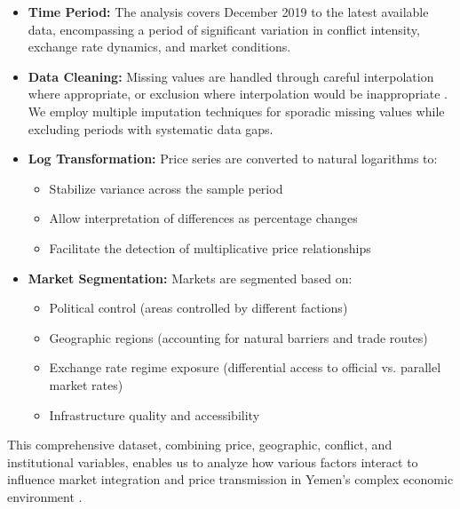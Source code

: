 \begin{itemize}[nosep]
\item \textbf{Time Period:} The analysis covers December 2019 to the latest available data, encompassing a period of significant variation in conflict intensity, exchange rate dynamics, and market conditions.

\item \textbf{Data Cleaning:} Missing values are handled through careful interpolation where appropriate, or exclusion where interpolation would be inappropriate \citep{lutkepohl2005}. We employ multiple imputation techniques for sporadic missing values while excluding periods with systematic data gaps.

\item \textbf{Log Transformation:} Price series are converted to natural logarithms to:
  \begin{itemize}[nosep]
  \item Stabilize variance across the sample period
  \item Allow interpretation of differences as percentage changes
  \item Facilitate the detection of multiplicative price relationships
  \end{itemize}

\item \textbf{Market Segmentation:} Markets are segmented based on:
  \begin{itemize}[nosep]
  \item Political control (areas controlled by different factions)
  \item Geographic regions (accounting for natural barriers and trade routes)
  \item Exchange rate regime exposure (differential access to official vs. parallel market rates)
  \item Infrastructure quality and accessibility
  \end{itemize}
\end{itemize}

This comprehensive dataset, combining price, geographic, conflict, and institutional variables, enables us to analyze how various factors interact to influence market integration and price transmission in Yemen's complex economic environment \citep{fackler2001spatial}.
